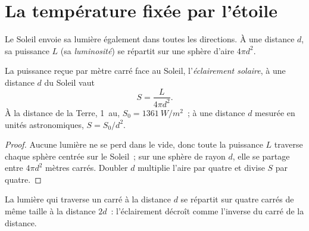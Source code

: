 \section{La température fixée par l'étoile}

Le Soleil envoie sa lumière également dans toutes les directions. À une
distance $d$, sa puissance $L$ (sa \emph{luminosité}) se répartit sur une
sphère d'aire $4\pi d^2$.

\begin{proposition}\label{prop:g10:habitable-planet:inverse-square}
La puissance reçue par mètre carré face au Soleil, l'\emph{éclairement
solaire}, à une distance $d$ du Soleil vaut
\[
  S = \frac{L}{4\pi d^2}.
\]
À la distance de la Terre, \qty{1}{au}, $S_0 = \qty{1361}{W/m^2}$~; à une
distance $d$ mesurée en unités astronomiques, $S = S_0/d^2$.
\end{proposition}

\begin{proof}
Aucune lumière ne se perd dans le vide, donc toute la puissance $L$
traverse chaque sphère centrée sur le Soleil~; sur une sphère de rayon $d$,
elle se partage entre $4\pi d^2$ mètres carrés. Doubler $d$ multiplie l'aire
par quatre et divise $S$ par quatre.
\end{proof}

\begin{omfigure}

{\small La lumière qui traverse un carré à la distance $d$ se répartit sur
quatre carrés de même taille à la distance $2d$~: l'éclairement décroît
comme l'inverse du carré de la distance.}
\end{omfigure}

